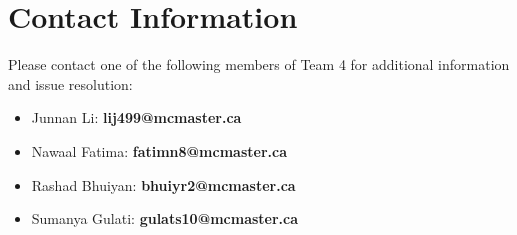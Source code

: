 \documentclass[titlepage]{article}
\begin{document}
\section{Contact Information}
Please contact one of the following members of Team 4 for additional information and issue resolution:
\begin{itemize}
    \item Junnan Li: \textbf{lij499@mcmaster.ca}
    \item Nawaal Fatima: \textbf{fatimn8@mcmaster.ca}
    \item Rashad Bhuiyan: \textbf{bhuiyr2@mcmaster.ca}
    \item Sumanya Gulati: \textbf{gulats10@mcmaster.ca}
\end{itemize}
\end{document}
